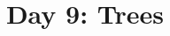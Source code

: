 \documentclass{article}
\begin{document}
\title{Day 9: Trees}
\author{}
\date{}
\maketitle


\end{document}
